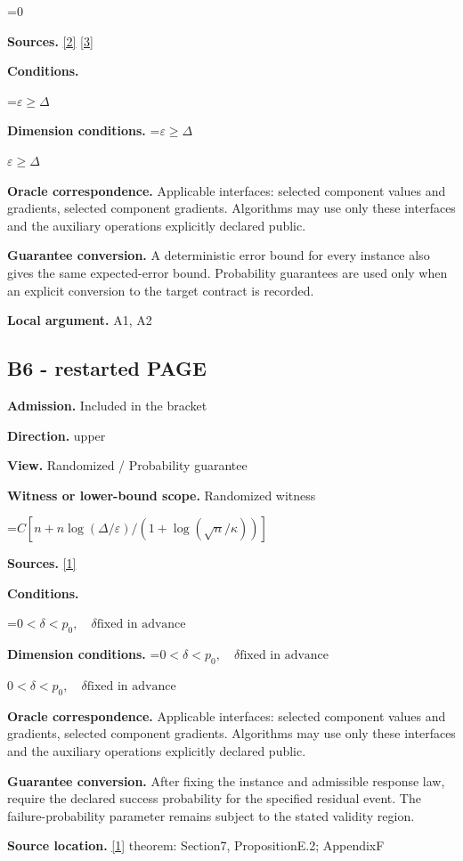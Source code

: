 \documentclass[10pt,a4paper]{article}
\newcommand{\AtlasMath}[1]{\par\begingroup\centering\setbox0=\hbox{$\displaystyle #1$}\ifdim\wd0>1.4\linewidth\typeout{ATLAS WIDE FORMULA: \the\wd0}\fi\ifdim\wd0>\linewidth\resizebox{\linewidth}{!}{\box0}\else\box0\fi\par\endgroup}
\newcommand{\AtlasInlineMath}[1]{\begingroup\setbox0=\hbox{$#1$}\ifdim\wd0>.4\linewidth\endgroup\AtlasMath{#1}\else\endgroup$#1$\fi}
\begin{document}
\AtlasMath{0}
\textbf{Sources.} \href{https://proceedings.mlr.press/v97/zhou19b/zhou19b.pdf}{[2]} \href{https://arxiv.org/pdf/1405.4980}{[3]}

\textbf{Conditions.} 
\AtlasMath{\varepsilon\ge\Delta}


\textbf{Dimension conditions.} \AtlasInlineMath{\varepsilon\ge\Delta}

\textbf{Oracle correspondence.} Applicable interfaces: selected component values and gradients, selected component gradients. Algorithms may use only these interfaces and the auxiliary operations explicitly declared public.

\textbf{Guarantee conversion.} A deterministic error bound for every instance also gives the same expected-error bound. Probability guarantees are used only when an explicit conversion to the target contract is recorded.

\textbf{Local argument.} A1, A2

\subsection{B6 - restarted PAGE}
\textbf{Admission.} Included in the bracket

\textbf{Direction.} upper

\textbf{View.} Randomized / Probability guarantee

\textbf{Witness or lower-bound scope.} Randomized witness

\AtlasMath{C[n+n\log(\Delta/\varepsilon)/(1+\log(\sqrt n/\kappa))]}
\textbf{Sources.} \href{https://arxiv.org/pdf/2609.00045v3}{[1]}

\textbf{Conditions.} 
\AtlasMath{0<\delta<p_0,\quad\delta\text{fixed in advance}}


\textbf{Dimension conditions.} \AtlasInlineMath{0<\delta<p_0,\quad\delta\text{fixed in advance}}

\textbf{Oracle correspondence.} Applicable interfaces: selected component values and gradients, selected component gradients. Algorithms may use only these interfaces and the auxiliary operations explicitly declared public.

\textbf{Guarantee conversion.} After fixing the instance and admissible response law, require the declared success probability for the specified residual event. The failure-probability parameter remains subject to the stated validity region.

\textbf{Source location.} \href{https://arxiv.org/pdf/2609.00045v3}{[1]} theorem: Section7, PropositionE.2; AppendixF
\end{document}

